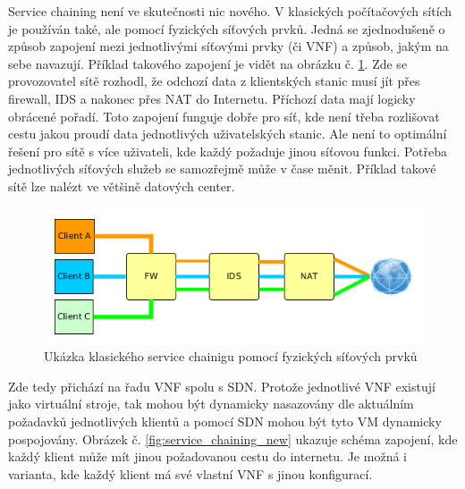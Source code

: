 Service chaining není ve skutečnosti nic nového. V klasických počítačových sítích je používán také, ale pomocí fyzických síťových prvků. Jedná se zjednodušeně o způsob zapojení mezi jednotlivými síťovými prvky (či VNF) a způsob, jakým na sebe navazují. Příklad takového zapojení je vidět na obrázku č. \ref{fig:service_chaining}. Zde se provozovatel sítě rozhodl, že odchozí data z klientských stanic musí jít přes firewall, IDS a nakonec přes NAT do Internetu. Příchozí data mají logicky obrácené pořadí. Toto zapojení funguje dobře pro síť, kde není třeba rozlišovat cestu jakou proudí data jednotlivých uživatelských stanic. Ale není to optimální řešení pro sítě s více uživateli, kde každý požaduje jinou síťovou funkci. Potřeba jednotlivých síťových služeb se samozřejmě může v čase měnit. Příklad takové sítě lze nalézt ve většině datových center. 

\begin{figure}[h]
\begin{centering}
\includegraphics[scale=0.55]{images/service_chaining}
\par\end{centering}
\caption{Ukázka klasického service chainigu pomocí fyzických síťových prvků\label{fig:service_chaining}}
\end{figure}

Zde tedy přichází na řadu VNF spolu s SDN. Protože jednotlivé VNF existují jako virtuální stroje, tak mohou být dynamicky nasazovány dle aktuálním požadavků jednotlivých klientů a pomocí SDN mohou být tyto VM dynamicky pospojovány. Obrázek č. \ref{fig:service_chaining_new} ukazuje schéma zapojení, kde každý klient může mít jinou požadovanou cestu do internetu. Je možná i varianta, kde každý klient má své vlastní VNF s jinou konfigurací.

